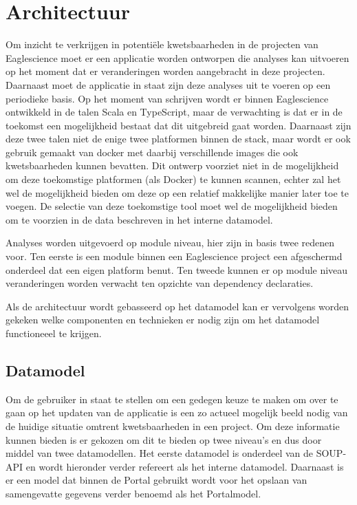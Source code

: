\chapter{Architectuur}\label{ch:Architectuur}

Om inzicht te verkrijgen in potentiële kwetsbaarheden in de projecten van Eaglescience moet er een applicatie worden ontworpen die analyses kan uitvoeren op het moment dat er veranderingen worden aangebracht in deze projecten. Daarnaast moet de applicatie in staat zijn deze analyses uit te voeren op een periodieke basis.
Op het moment van schrijven wordt er binnen Eaglescience ontwikkeld in de talen Scala en TypeScript, maar de verwachting is dat er in de toekomst een mogelijkheid bestaat dat dit uitgebreid gaat worden. Daarnaast zijn deze twee talen niet de enige twee platformen binnen de stack, maar wordt er ook gebruik gemaakt van docker met daarbij verschillende images die ook kwetsbaarheden kunnen bevatten. Dit ontwerp voorziet niet in de mogelijkheid om deze toekomstige platformen (als Docker) te kunnen scannen, echter zal het wel de mogelijkheid bieden om deze op een relatief makkelijke manier later toe te voegen. De selectie van deze toekomstige tool moet wel de mogelijkheid bieden om te voorzien in de data beschreven in het interne datamodel.

Analyses worden uitgevoerd op module niveau, hier zijn in basis twee redenen voor. Ten eerste is een module binnen een Eaglescience project een afgeschermd onderdeel dat een eigen platform benut. Ten tweede kunnen er op module niveau veranderingen worden verwacht ten opzichte van dependency declaraties.

Als de architectuur wordt gebasseerd op het datamodel kan er vervolgens worden gekeken welke componenten en technieken er nodig zijn om het datamodel functioneeel te krijgen.

\section{Datamodel}\label{sec:datamodel}
Om de gebruiker in staat te stellen om een gedegen keuze te maken om over te gaan op het updaten van de applicatie is een zo actueel mogelijk beeld nodig van de huidige situatie omtrent kwetsbaarheden in een project. Om deze informatie kunnen bieden is er gekozen om dit te bieden op twee niveau's en dus door middel van twee datamodellen.
Het eerste datamodel is onderdeel van de SOUP-API en wordt hieronder verder refereert als het interne datamodel. Daarnaast is er een model dat binnen de Portal gebruikt wordt voor het opslaan van samengevatte gegevens verder benoemd als het Portalmodel.

